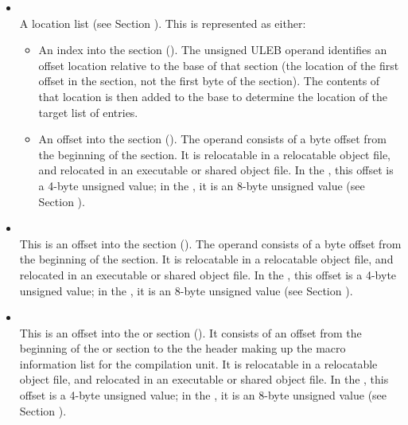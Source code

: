\begin{itemize}
\item \CLASSloclist \\
\bb
A location list (see Section ).
\eb
This is represented as either:
\begin{itemize}
\item
An index into the \dotdebugloclists{} section (\DWFORMloclistxTARG). 
The unsigned ULEB operand identifies an offset location 
relative to the base of that section (the location of the first offset 
in the section, not the first byte of the section). The contents of 
that location is then added to the base to determine the location of 
the target list of entries.
\item
An offset into the \dotdebugloclists{} section (\DWFORMsecoffset). 
The operand consists of a byte 
offset
from the beginning of the \dotdebugloclists{} section.
It is relocatable in a relocatable object file, and
relocated in an executable or shared object file. In the 
\thirtytwobitdwarfformat, this offset is a 4-byte unsigned value;
in the \sixtyfourbitdwarfformat, it is an 8-byte unsigned value
(see Section ).
\end{itemize}

\item \CLASSloclistsptr \\
This is an offset into the \dotdebugloclists{} section (\DWFORMsecoffset). 
The operand consists of a byte 
offset
from the beginning of the \dotdebugloclists{} section.
It is relocatable in a relocatable object file, and
relocated in an executable or shared object file. In the 
\thirtytwobitdwarfformat, this offset is a 4-byte unsigned value;
in the \sixtyfourbitdwarfformat, it is an 8-byte unsigned value
(see Section ).

\item \CLASSmacptr \\
This is an 
offset into the 
\dotdebugmacro{} or \dotdebugmacrodwo{} section
(\DWFORMsecoffset). 
It consists of an offset from the beginning of the 
\dotdebugmacro{} or \dotdebugmacrodwo{} 
section to the the header making up the 
macro information list for the compilation unit. 
It is relocatable in a relocatable object file, and
relocated in an executable or shared object file. In the 
\thirtytwobitdwarfformat, this offset is a 4-byte unsigned value;
in the \sixtyfourbitdwarfformat, it is an 8-byte unsigned value
(see Section ).


\end{itemize}
